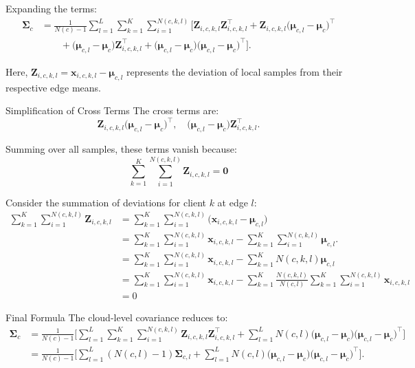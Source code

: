 \documentclass[journal]{IEEEtran}
\begin{document}
Expanding the terms:
\begin{align}
\mathbf{\Sigma}_c &= \frac{1}{N(c)-1} \sum_{l=1}^L \sum_{k=1}^K \sum_{i=1}^{N(c,k,l)} 
\Big[
\mathbf{Z}_{i,c,k,l} \mathbf{Z}_{i,c,k,l}^\top + 
\mathbf{Z}_{i,c,k,l} \big( \mathbf{\mu}_{c,l} - \mathbf{\mu}_c \big)^\top \nonumber \\
&\qquad + 
\big( \mathbf{\mu}_{c,l} - \mathbf{\mu}_c \big) \mathbf{Z}_{i,c,k,l}^\top + 
\big( \mathbf{\mu}_{c,l} - \mathbf{\mu}_c \big) \big( \mathbf{\mu}_{c,l} - \mathbf{\mu}_c \big)^\top
\Big].
\end{align}

Here, \( \mathbf{Z}_{i,c,k,l} = \mathbf{x}_{i,c,k,l} - \mathbf{\mu}_{c,l} \) represents the deviation of local samples from their respective edge means.

Simplification of Cross Terms
The cross terms are:
\begin{equation}
\mathbf{Z}_{i,c,k,l} \big( \mathbf{\mu}_{c,l} - \mathbf{\mu}_c \big)^\top, \quad
\big( \mathbf{\mu}_{c,l} - \mathbf{\mu}_c \big) \mathbf{Z}_{i,c,k,l}^\top.
\end{equation}

Summing over all samples, these terms vanish because:
\begin{equation}
  \sum_{k=1}^K \sum_{i=1}^{N(c,k,l)} \mathbf{Z}_{i,c,k,l} = \mathbf{0}
\end{equation}

Consider the summation of deviations for client \( k \) at edge \( l \):
\begin{align*}
\sum_{k=1}^K\sum_{i=1}^{N(c,k,l)} \mathbf{Z}_{i,c,k,l} &= \sum_{k=1}^K \sum_{i=1}^{N(c,k,l)} \big( \mathbf{x}_{i,c,k,l} - \mathbf{\mu}_{c,l} \big) \\
&= \sum_{k=1}^K\sum_{i=1}^{N(c,k,l)} \mathbf{x}_{i,c,k,l} - \sum_{k=1}^K\sum_{i=1}^{N(c,k,l)} \mathbf{\mu}_{c,l}. \\
&= \sum_{k=1}^K\sum_{i=1}^{N(c,k,l)} \mathbf{x}_{i,c,k,l} - \sum_{k=1}^K N(c,k,l) \mathbf{\mu}_{c,l} \\
&= \sum_{k=1}^K\sum_{i=1}^{N(c,k,l)} \mathbf{x}_{i,c,k,l} - \sum_{k=1}^K\frac{N(c,k,l)}{N(c,l)} \sum_{k=1}^K \sum_{i=1}^{N(c,k,l)} \mathbf{x}_{i,c,k,l} \\
&= 0
\end{align*}



Final Formula
The cloud-level covariance reduces to:
\begin{align}
\mathbf{\Sigma}_c &= \frac{1}{N(c)-1} \Bigg[
\sum_{l=1}^L \sum_{k=1}^K \sum_{i=1}^{N(c,k,l)} \mathbf{Z}_{i,c,k,l} \mathbf{Z}_{i,c,k,l}^\top + 
\sum_{l=1}^L N(c,l) \big( \mathbf{\mu}_{c,l} - \mathbf{\mu}_c \big) \big( \mathbf{\mu}_{c,l} - \mathbf{\mu}_c \big)^\top
\Bigg] \nonumber \\
&= \frac{1}{N(c)-1} \Bigg[
\sum_{l=1}^L (N(c,l)-1) \mathbf{\Sigma}_{c,l} + 
\sum_{l=1}^L N(c,l) \big( \mathbf{\mu}_{c,l} - \mathbf{\mu}_c \big) \big( \mathbf{\mu}_{c,l} - \mathbf{\mu}_c \big)^\top
\Bigg].
\end{align}
\end{document}

